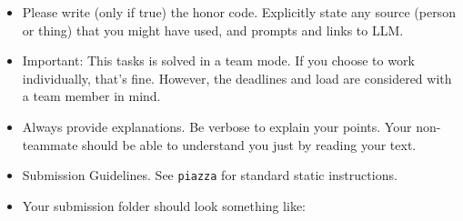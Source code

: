 \begin{itemize}

\item Please write (only if true) the honor code. Explicitly state any source (person or thing) that you might have used, and prompts and links to LLM.

\item Important: This tasks is solved in a team mode.  If you choose to work individually, that's fine. However, the deadlines and load are considered with a team member in mind.

\item Always provide explanations. Be verbose to explain your points. Your non-teammate should be able to understand you just by reading your text.

\item Submission Guidelines. See \verb+piazza+ for standard static
instructions.  \item Your submission folder should look something
like: 


\begin{minipage}[t]{\textwidth}  
\end{minipage}
\end{itemize}

\hrulefill \\
